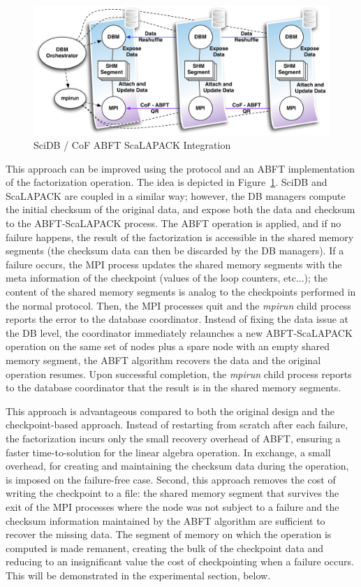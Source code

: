 \begin{figure}
\begin{center}
\includegraphics[width=.9\linewidth]{figures/CoF-DDB.pdf}
\caption{SciDB / CoF ABFT ScaLAPACK Integration\label{fig:scidb-cof}}
\end{center}
\end{figure}


This approach can be improved using the \cof protocol and an ABFT
implementation of the factorization operation. The idea is depicted in
Figure~\ref{fig:scidb-cof}. SciDB and ScaLAPACK are coupled in a similar
way; however, the DB managers compute the initial checksum of the
original data, and expose both the data and checksum to the
ABFT-ScaLAPACK process. The ABFT operation is applied, and if no failure
happens, the result of the factorization is accessible in the shared
memory segments (the checksum data can then be discarded by the DB
managers). If a failure occurs, the MPI process updates the shared
memory segments with the meta information of the checkpoint (values of
the loop counters, etc...); the content of the shared memory segments is
analog to the checkpoints performed in the normal \cof protocol. Then,
the MPI processes quit and the {\it mpirun} child process reports the
error to the database coordinator. Instead of fixing the data issue at
the DB level, the coordinator immediately relaunches a new
ABFT-ScaLAPACK operation on the same set of nodes plus a spare node with
an empty shared memory segment, the ABFT algorithm recovers the data and
the original operation resumes. Upon successful completion, the
{\it mpirun} child process reports to the database coordinator
that the result is in the shared memory segments.

This approach is advantageous compared to both the original design and
the checkpoint-based \cof approach. 
%
  Instead of restarting from scratch after each failure, the
  factorization incurs only the small recovery overhead of ABFT, ensuring a
  faster time-to-solution for the linear algebra operation. In exchange, a small
  overhead, for creating and maintaining the checksum data during the operation,
  is imposed on the failure-free case.
%
Second, this approach removes the cost of writing the checkpoint to a
  file: the shared memory segment that survives the exit of the MPI processes
  where the node was not subject to a failure and the checksum information
  maintained by the ABFT algorithm are sufficient to recover the missing
  data. The segment of memory on which the operation is computed is made
  remanent, creating the bulk of the checkpoint data and reducing to an
  insignificant value the cost of checkpointing when a failure occurs. This will
  be demonstrated in the experimental section, below.

 

